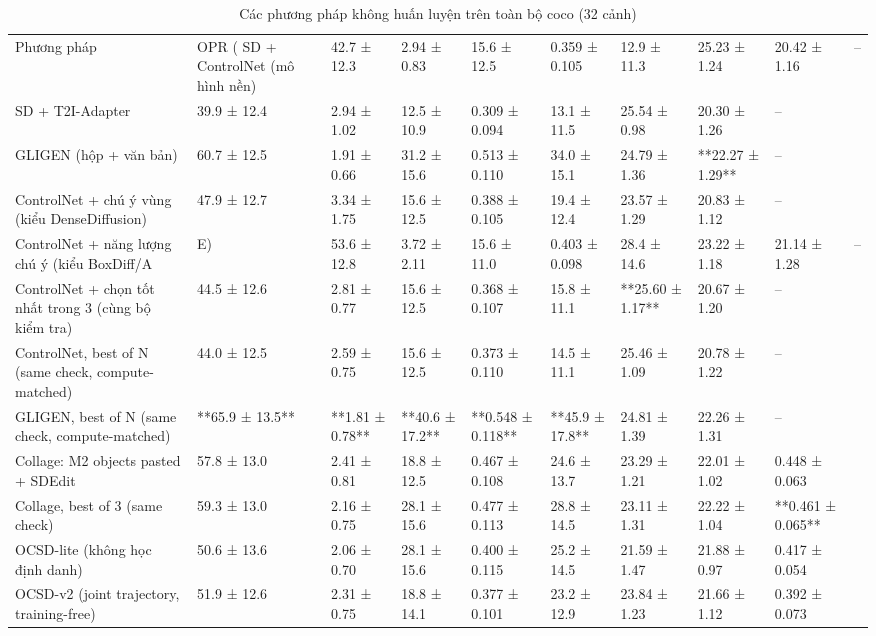 \begin{table}
\caption{Các phương pháp không huấn luyện trên toàn bộ coco (32 cảnh)}
\begin{tabular}{lllllllll}
\toprule
Phương pháp & OPR (%
\midrule
SD + ControlNet (mô hình nền) & 42.7 ± 12.3 & 2.94 ± 0.83 & 15.6 ± 12.5 & 0.359 ± 0.105 & 12.9 ± 11.3 & 25.23 ± 1.24 & 20.42 ± 1.16 & – \\
SD + T2I-Adapter & 39.9 ± 12.4 & 2.94 ± 1.02 & 12.5 ± 10.9 & 0.309 ± 0.094 & 13.1 ± 11.5 & 25.54 ± 0.98 & 20.30 ± 1.26 & – \\
GLIGEN (hộp + văn bản) & 60.7 ± 12.5 & 1.91 ± 0.66 & 31.2 ± 15.6 & 0.513 ± 0.110 & 34.0 ± 15.1 & 24.79 ± 1.36 & **22.27 ± 1.29** & – \\
ControlNet + chú ý vùng (kiểu DenseDiffusion) & 47.9 ± 12.7 & 3.34 ± 1.75 & 15.6 ± 12.5 & 0.388 ± 0.105 & 19.4 ± 12.4 & 23.57 ± 1.29 & 20.83 ± 1.12 & – \\
ControlNet + năng lượng chú ý (kiểu BoxDiff/A&E) & 53.6 ± 12.8 & 3.72 ± 2.11 & 15.6 ± 11.0 & 0.403 ± 0.098 & 28.4 ± 14.6 & 23.22 ± 1.18 & 21.14 ± 1.28 & – \\
ControlNet + chọn tốt nhất trong 3 (cùng bộ kiểm tra) & 44.5 ± 12.6 & 2.81 ± 0.77 & 15.6 ± 12.5 & 0.368 ± 0.107 & 15.8 ± 11.1 & **25.60 ± 1.17** & 20.67 ± 1.20 & – \\
ControlNet, best of N (same check, compute-matched) & 44.0 ± 12.5 & 2.59 ± 0.75 & 15.6 ± 12.5 & 0.373 ± 0.110 & 14.5 ± 11.1 & 25.46 ± 1.09 & 20.78 ± 1.22 & – \\
GLIGEN, best of N (same check, compute-matched) & **65.9 ± 13.5** & **1.81 ± 0.78** & **40.6 ± 17.2** & **0.548 ± 0.118** & **45.9 ± 17.8** & 24.81 ± 1.39 & 22.26 ± 1.31 & – \\
Collage: M2 objects pasted + SDEdit & 57.8 ± 13.0 & 2.41 ± 0.81 & 18.8 ± 12.5 & 0.467 ± 0.108 & 24.6 ± 13.7 & 23.29 ± 1.21 & 22.01 ± 1.02 & 0.448 ± 0.063 \\
Collage, best of 3 (same check) & 59.3 ± 13.0 & 2.16 ± 0.75 & 28.1 ± 15.6 & 0.477 ± 0.113 & 28.8 ± 14.5 & 23.11 ± 1.31 & 22.22 ± 1.04 & **0.461 ± 0.065** \\
OCSD-lite (không học định danh) & 50.6 ± 13.6 & 2.06 ± 0.70 & 28.1 ± 15.6 & 0.400 ± 0.115 & 25.2 ± 14.5 & 21.59 ± 1.47 & 21.88 ± 0.97 & 0.417 ± 0.054 \\
OCSD-v2 (joint trajectory, training-free) & 51.9 ± 12.6 & 2.31 ± 0.75 & 18.8 ± 14.1 & 0.377 ± 0.101 & 23.2 ± 12.9 & 23.84 ± 1.23 & 21.66 ± 1.12 & 0.392 ± 0.073 \\
\bottomrule
\end{tabular}
\end{table}
